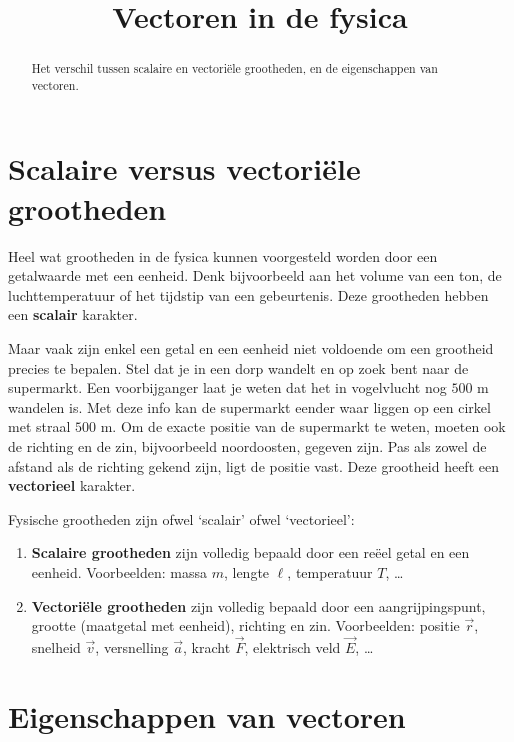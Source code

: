 \documentclass{ximera}
\title{Vectoren in de fysica}
\begin{document}
\begin{abstract}
    Het verschil tussen scalaire en vectoriële grootheden, en de eigenschappen van vectoren.
\end{abstract}
\maketitle

\section{Scalaire versus vectoriële grootheden}

Heel wat grootheden in de fysica kunnen voorgesteld worden door een getalwaarde met een eenheid. Denk bijvoorbeeld aan het volume van een ton, de luchttemperatuur of het tijdstip van een gebeurtenis. Deze grootheden hebben een \textbf{scalair} karakter.

Maar vaak zijn enkel een getal en een eenheid niet voldoende om een grootheid precies te bepalen. Stel dat je in een dorp wandelt en op zoek bent naar de supermarkt. Een voorbijganger laat je weten dat het in vogelvlucht nog $500\text{ m}$ wandelen is. Met deze info kan de supermarkt eender waar liggen op een cirkel met straal $500\text{ m}$. Om de exacte positie van de supermarkt te weten, moeten ook de richting en de zin, bijvoorbeeld noordoosten, gegeven zijn. Pas als zowel de afstand als de richting gekend zijn, ligt de positie vast. Deze grootheid heeft een \textbf{vectorieel} karakter.

\begin{definition}[title={Scalaire en vectoriële grootheden}]\nl
    Fysische grootheden zijn ofwel `scalair' ofwel `vectorieel': 
    \begin{enumerate}
        \item \textbf{Scalaire grootheden} zijn volledig bepaald door een reëel getal en een eenheid. 
        Voorbeelden: massa $m$, lengte $\ell$, temperatuur $T$, \dots
        \item \textbf{Vectoriële grootheden} zijn volledig bepaald door een aangrijpingspunt, grootte (maatgetal met eenheid), richting en zin. 
        Voorbeelden: positie $\vec{r}$, snelheid $\vec{v}$, versnelling $\vec{a}$, kracht $\vec{F}$, elektrisch veld $\vec{E}$, \dots
    \end{enumerate}
\end{definition}

\section{Eigenschappen van vectoren}
\end{document}
